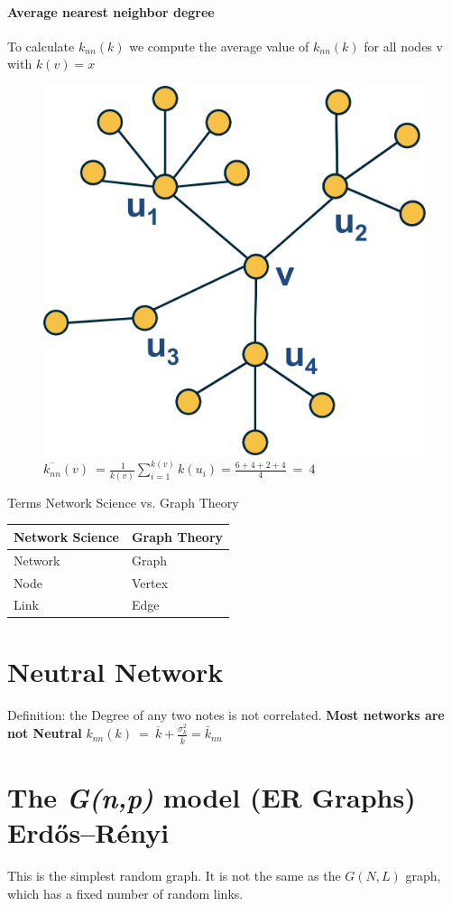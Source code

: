 \documentclass{article}
\begin{document}
\paragraph{Average nearest neighbor degree}
To calculate  $k_{nn}(k)$ we compute the average value of $k_{nn}(k)$ for all nodes v with $k(v)=x$

\begin{figure}
    \centering
    \includegraphics[width=0.5\linewidth]{k-neighbor-example.png}
    \caption{    $\overline{k_{nn}}\left(v\right)\:=\frac{\:1}{k\left(v\right)}\sum_{i=1}^{k\left(v\right)}k\left(u_i\right)=\frac{6+4+2+4}{4}\:=\:4$}
\end{figure}
Terms Network Science vs. Graph Theory
\begin{table}
\centering

\begin{tabular}{|l|l|}
\hline
\textbf{Network Science} & \textbf{Graph Theory}\\
\hline

\hline
Network & Graph  \\
\hline
Node & Vertex  \\
\hline
Link & Edge  \\
\hline

\end{tabular}

\end{table}


\newpage
\section{Neutral Network}
Definition: the Degree of any two notes is not correlated.
\textbf{Most networks are not Neutral}
$k_{nn}(k)\:=\:\overline{k}+\frac{\sigma_k^2}{\overline{k}}=\bar{k}_{nn}$
\newpage
\section{The \textit{G(n,p)} model (ER Graphs) Erdős–Rényi}
This is the simplest random graph. It is not the same as the $G(N,L)$ graph, which has a fixed number of random links.
\end{document}
